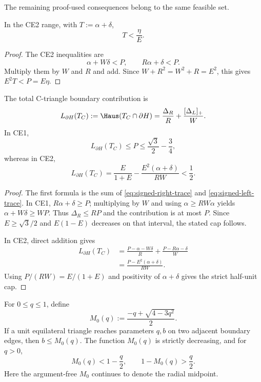 The remaining proof-used consequences belong to the same feasible set.

\begin{lemma}
\label{lem:new-signed-ce2-total-slack}
In the CE2 range, with $T:=\alpha+\delta$,
\begin{equation}
 T<\frac{\eta}{E}.
 \label{eq:signed-total-slack}
\end{equation}
\end{lemma}

\begin{proof}
The CE2 inequalities are
\[
 \alpha+W\delta<P,
 \qquad
 R\alpha+\delta<P.
\]
Multiply them by $W$ and $R$ and add.  Since
$W+R^2=W^2+R=E^2$, this gives $E^2T<P=E\eta$.
\end{proof}

\begin{corollary}
\label{cor:signed-center-boundary}
The total C-triangle boundary contribution is
\begin{equation}
 L_{\partial H}(T_C)
 :=\Haus(T_C\cap\partial H)
 =\frac{\Delta_R}{R}+\frac{[\Delta_L]_+}{W}.
 \label{eq:signed-boundary-length}
\end{equation}
In CE1,
\[
 L_{\partial H}(T_C)
 \le P\le\frac{\sqrt3}{2}-\frac34,
\]
whereas in CE2,
\[
 L_{\partial H}(T_C)
 =\frac{E}{1+E}-\frac{E^2(\alpha+\delta)}{RW}<\frac12.
\]
\end{corollary}

\begin{proof}
The first formula is the sum of \eqref{eq:signed-right-trace} and
\eqref{eq:signed-left-trace}.  In CE1, $R\alpha+\delta\ge P$; multiplying
by $W$ and using $\alpha\ge RW\alpha$ yields
$\alpha+W\delta\ge WP$.  Thus $\Delta_R\le RP$ and the contribution is at
most $P$.  Since $E\ge\sqrt3/2$ and $E(1-E)$ decreases on that interval,
the stated cap follows.

In CE2, direct addition gives
\[
 \begin{aligned}
 L_{\partial H}(T_C)
 &=\frac{P-\alpha-W\delta}{R}
   +\frac{P-R\alpha-\delta}{W}\\
 &=\frac{P-E^2(\alpha+\delta)}{RW}.
 \end{aligned}
\]
Using $P/(RW)=E/(1+E)$ and positivity of $\alpha+\delta$ gives the strict
half-unit cap.
\end{proof}

\begin{lemma}
\label{lem:signed-diameter-transfer}
For $0\le q\le1$, define
\[
 M_0(q):=\frac{-q+\sqrt{4-3q^2}}2.
\]
If a unit equilateral triangle reaches parameters $q,b$ on two adjacent
boundary edges, then $b\le M_0(q)$.  The function $M_0(q)$ is strictly
decreasing, and for $q>0$,
\[
 M_0(q)<1-\frac q2,
 \qquad
 1-M_0(q)>\frac q2.
\]
Here the argument-free $M_0$ continues to denote the radial midpoint.
\end{lemma}

